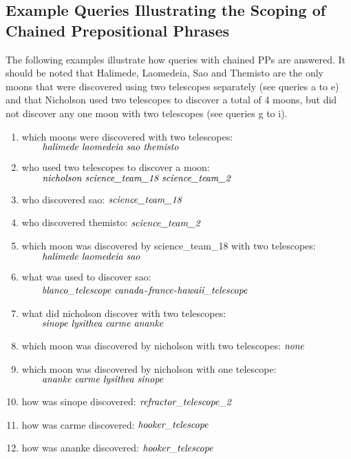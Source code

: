 \documentclass[../main.tex]{subfiles}
\begin{document}
\begin{refsection}
\subsection{Example Queries Illustrating the Scoping of Chained Prepositional Phrases}

The following examples illustrate how queries with chained PPs are answered.
It should be noted that Halimede, Laomedeia, Sao and
Themisto are the only moons that were discovered using two
telescopes separately (see queries a to e) and that Nicholson used two telescopes to discover a total of 4
moons, but did not discover any one moon with two telescopes (see queries g to i).

\begin{enumerate}[label=\alph*.]
	\setlength\itemsep{0em}
	\item which moons were discovered with two telescopes: \\ $\textit{\qquad halimede laomedeia sao themisto}$
	\item who used two telescopes to discover a moon: \\ $\textit{\qquad nicholson science\_team\_18 science\_team\_2}$
	\item who discovered sao: $\textit{science\_team\_18}$
	\item who discovered themisto: $\textit{science\_team\_2}$
	\item which moon was discovered by science\_team\_18 with two telescopes: \\ $\textit{\qquad halimede laomedeia sao}$
	\item what was used to discover sao: \\ $\textit{\qquad blanco\_telescope canada}$-$\textit{france}$-$\textit{hawaii\_telescope}$
	\item what did nicholson discover with two telescopes: \\ $\textit{\qquad sinope lysithea carme ananke}$
	\item which moon was discovered by nicholson with two telescopes: $\textit{none}$
	\item which moon was discovered by nicholson with one telescope: \\ $\textit{\qquad ananke carme lysithea sinope}$
	\item how was sinope discovered: $\textit{refractor\_telescope\_2}$
	\item how was carme discovered: $\textit{hooker\_telescope}$
	\item how was ananke discovered: $\textit{hooker\_telescope}$

\end{enumerate}
\end{refsection}
\end{document}
